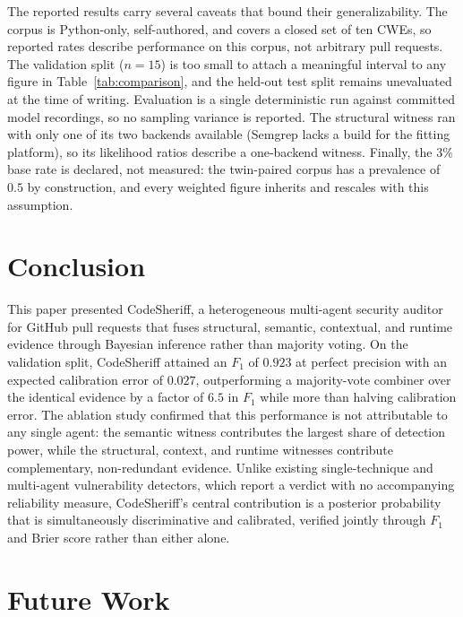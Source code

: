 \documentclass[conference]{IEEEtran}
\begin{document}
The reported results carry several caveats that bound their
generalizability. The corpus is Python-only, self-authored, and covers a
closed set of ten CWEs, so reported rates describe performance on this
corpus, not arbitrary pull requests. The validation split ($n{=}15$) is too
small to attach a meaningful interval to any figure in
Table~\ref{tab:comparison}, and the held-out test split remains unevaluated
at the time of writing. Evaluation is a single deterministic run against
committed model recordings, so no sampling variance is reported. The
structural witness ran with only one of its two backends available
(Semgrep lacks a build for the fitting platform), so its likelihood ratios
describe a one-backend witness. Finally, the $3\%$ base rate is declared,
not measured: the twin-paired corpus has a prevalence of $0.5$ by
construction, and every weighted figure inherits and rescales with this
assumption.

\section{Conclusion}
\label{sec:conclusion}

This paper presented CodeSheriff, a heterogeneous multi-agent security
auditor for GitHub pull requests that fuses structural, semantic,
contextual, and runtime evidence through Bayesian inference rather than
majority voting. On the validation split, CodeSheriff attained an $F_1$ of
$0.923$ at perfect precision with an expected calibration error of
$0.027$, outperforming a majority-vote combiner over the identical evidence
by a factor of $6.5$ in $F_1$ while more than halving calibration error.
The ablation study confirmed that this performance is not attributable to
any single agent: the semantic witness contributes the largest share of
detection power, while the structural, context, and runtime witnesses
contribute complementary, non-redundant evidence. Unlike existing
single-technique and multi-agent vulnerability detectors, which report a
verdict with no accompanying reliability measure, CodeSheriff's central
contribution is a posterior probability that is simultaneously
discriminative and calibrated, verified jointly through $F_1$ and Brier
score rather than either alone.

\section*{Future Work}
\label{sec:future}
\end{document}
